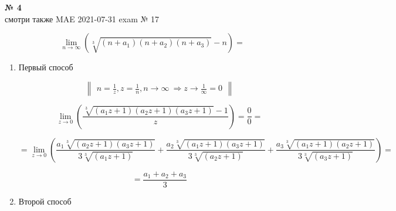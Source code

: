 \documentclass{article}
\begin{document}
\textbf{№ 4} 
\\ смотри также MAE 2021-07-31 exam № 17

\begingroup

$$ \lim_{n\to \infty} \left( \sqrt[3]{(n+a_1)(n+a_2)(n+a_3)} - n \right) 
= $$

\begin{enumerate}
\item Первый способ

$$ \begin{Vmatrix} n=\frac{1}{z}, z=\frac{1}{n}, n\to \infty \ \Rightarrow z\to\frac{1}{\infty}=0 \end{Vmatrix} $$

$$ \lim_{z\to 0} \left(\frac{\sqrt[3]{(a_1z+1)(a_2z+1)(a_3z+1)} - 1}{z} \right) 
= \frac{0}{0}
= $$

$$ = \lim_{z\to 0} \left( \frac{a_1\sqrt[3]{(a_2z+1)(a_3z+1)}}{3\sqrt[3]{(a_1z+1)}} 
+ \frac{a_2\sqrt[3]{(a_1z+1)(a_3z+1)}}{3\sqrt[3]{(a_2z+1)}} 
+ \frac{a_3\sqrt[3]{(a_1z+1)(a_2z+1)}}{3\sqrt[3]{(a_3z+1)}} \right)
= $$

$$ = \frac{a_1+a_2+a_3}{3} $$

\item Второй способ

\end{enumerate}
\endgroup
\end{document}
